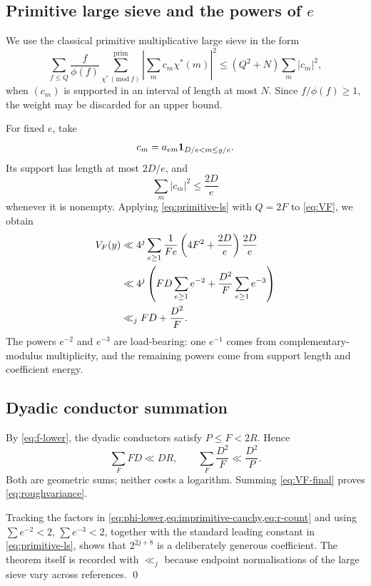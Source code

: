 
\subsection{Primitive large sieve and the powers of $e$}

We use the classical primitive multiplicative large sieve in the form
\cite{IwaniecKowalski2004,MontgomeryVaughan2007}
\begin{equation}\label{eq:primitive-ls}
 \sum_{f\le Q}\frac f{\phi(f)}
 \sum_{\chi^*\, (\mathrm{mod}\ f)}^{\mathrm{prim}}
 \left|\sum_m c_m\chi^*(m)\right|^2
 \le (Q^2+N)\sum_m|c_m|^2,
\end{equation}
when $(c_m)$ is supported in an interval of length at most $N$.  Since
$f/\phi(f)\ge1$, the weight may be discarded for an upper bound.

For fixed $e$, take
\[
 c_m=a_{em}\mathbf 1_{D/e<m\le y/e}.
\]
Its support has length at most $2D/e$, and
\begin{equation}\label{eq:c-energy-rough}
                  \sum_m|c_m|^2\le\frac{2D}{e}
\end{equation}
whenever it is nonempty.  Applying \cref{eq:primitive-ls} with $Q=2F$ to
\cref{eq:VF}, we obtain
\begin{align}
 V_F(y)
 &\ll 4^j\sum_{e\ge1}\frac1{Fe}
       \left(4F^2+\frac{2D}{e}\right)\frac{2D}{e}\notag\\
 &\ll 4^j\left(
       FD\sum_{e\ge1}e^{-2}
       +\frac{D^2}{F}\sum_{e\ge1}e^{-3}
       \right)\notag\\
 &\ll_j FD+\frac{D^2}{F}.
 \label{eq:VF-final}
\end{align}
The powers $e^{-2}$ and $e^{-3}$ are load-bearing: one $e^{-1}$ comes from
complementary-modulus multiplicity, and the remaining powers come from support
length and coefficient energy.

\subsection{Dyadic conductor summation}

By \cref{eq:f-lower}, the dyadic conductors satisfy $P\le F<2R$.  Hence
\begin{equation}\label{eq:F-sums}
       \sum_F FD\ll DR,
 \qquad
       \sum_F\frac{D^2}{F}\ll\frac{D^2}{P}.
\end{equation}
Both are geometric sums; neither costs a logarithm.  Summing
\cref{eq:VF-final} proves \cref{eq:roughvariance}.

Tracking the factors in
\cref{eq:phi-lower,eq:imprimitive-cauchy,eq:r-count} and using
$\sum e^{-2}<2$, $\sum e^{-3}<2$, together with the standard leading constant
in \cref{eq:primitive-ls}, shows that $2^{2j+8}$ is a deliberately generous
coefficient.  The theorem itself is recorded with $\ll_j$ because endpoint
normalisations of the large sieve vary across references.
\qed

